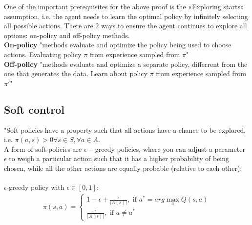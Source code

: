 One of the important prerequisites for the above proof is the 
«Exploring starts» assumption, i.e. the agent needs to learn the optimal policy by infinitely selecting all possible actions. There are 2 ways to ensure the agent continues to 
explore all options: on-policy and off-policy methods. \\

\textbf{On-policy} "methods evaluate and optimize the policy 
being used to choose actions. Evaluating policy $\pi$ from experience sampled from $\pi$"\\

\textbf{Off-policy} "methods evaluate and optimize a separate  policy, differrent from the one that generates the data. Learn about policy $\pi$ from experience sampled from $\pi'$"

\subsection{Soft control}

"Soft policies have a property such that all actions have a chance to be explored, i.e. $\pi(a, s) > 0 \forall s \in S, \forall a \in A.$\\

A form of soft-policies are $\epsilon-$greedy policies, where 
you can adjust a parameter $\epsilon$ to weigh a particular action such that it has a higher probability of being chosen,
while all the other actions are equally probable (relative to each other):\\\\
$\epsilon$-greedy policy with $\epsilon \in [0, 1]$:
\begin{align}
    \pi(s, a) = \begin{cases} 
        1 - \epsilon + \frac{\epsilon}{|A(s)|}, \text{ if } a^{*} = arg \max_{a} Q(s, a) \\
        \frac{\epsilon}{|A(s)|}, \text{ if }  a \neq a^*
    \end{cases}   
\end{align}
